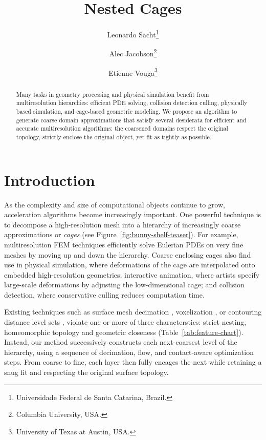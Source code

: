 \documentclass{cgyrf15}
\title{Nested Cages}
\author{
Leonardo Sacht\thanks{Universidade Federal de Santa Catarina, Brazil.} \and
Alec Jacobson\thanks{Columbia University, USA.} \and
Etienne Vouga\thanks{University of Texas at Austin, USA.} 
}
\begin{document}
\maketitle

\begin{abstract}
Many tasks in geometry processing and physical simulation benefit from
multiresolution hierarchies: efficient PDE solving, collision detection
culling, physically based simulation, and cage-based geometric modeling. We
propose an algorithm to generate coarse domain approximations that satisfy
several desiderata for efficient and accurate multiresolution algorithms: the
coarsened domains respect the original topology, strictly enclose the original
object, yet fit as tightly as possible.
\end{abstract}

\section{Introduction}

As the complexity and size of computational objects continue to grow,
acceleration algorithms become increasingly important. One powerful technique
is to decompose a high-resolution mesh into a hierarchy of increasingly coarse
approximations or \emph{cages} (see Figure~\ref{fig:bunny-shelf-teaser}). For example,
multiresolution FEM techniques efficiently solve Eulerian PDEs on very fine
meshes by moving up and down the hierarchy.  Coarse enclosing cages also find
use in physical simulation, where deformations of the cage are interpolated
onto embedded high-resolution geometries; interactive animation, where
artists specify large-scale deformations by adjusting the low-dimensional cage;
and collision detection, where conservative culling reduces computation
time. 

Existing techniques such as surface mesh decimation \cite{Hoppe:1996:PM}, 
voxelization \cite{Xian:2009}, or
contouring distance level sets \cite{Shen:2004:IAI}, violate one or more of three characterstics:
strict nesting, homeomorphic topology and geometric closeness
(Table~\ref{tab:feature-chart}).  Instead, our method successively constructs
each next-coarsest level of the hierarchy, using a sequence of decimation,
flow, and contact-aware optimization steps.  From coarse to fine, each layer
then fully encages the next while retaining a snug fit and respecting the
original surface topology.
\end{document}
